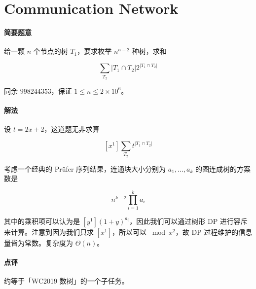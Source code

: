 \documentclass[12pt]{ctexart}
\theoremstyle{theorem}
\theoremstyle{theorem}
\begin{document}
\newpage

\section{Communication Network}

\paragraph{简要题意}

给一颗 $n$ 个节点的树 $T_1$，要求枚举 $n^{n-2}$ 种树，求和

$$
\sum_{T_2} |T_1 \cap T_2|2^{|T_1 \cap T_2|}
$$

同余 $998244353$，保证 $1\le n\le 2\times 10^6$。

\paragraph{解法}

设 $t=2x+2$，这道题无非求算

$$
[x^1] \sum_{T_2} t^{|T_1 \cap T_2|}
$$

考虑一个经典的 Pr\"ufer 序列结果，连通块大小分别为 $a_1,\dots,a_k$ 的图连成树的方案数是

$$
n^{k-2}\prod_{i=1}^k a_i
$$

其中的乘积项可以认为是 $[y^1](1+y)^{a_i}$，因此我们可以通过树形 DP 进行容斥来计算。注意到因为我们只求 $[x^1]$，所以可以 $\bmod x^2$，故 DP 过程维护的信息量皆为常数。复杂度为 $\Theta(n)$。

\paragraph{点评} 约等于「WC2019 数树」的一个子任务。
\end{document}
